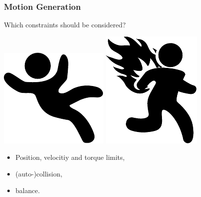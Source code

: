 \documentclass[14pt,utf8,hyperref={pdfpagelabels=false}]{beamer}
\begin{document}
\begin{slideDecision}
  \frametitle{Motion Generation}


  \begin{changeleftmargin}{1.1cm}
  \begin{center}
    Which constraints should be considered?\par
    \vspace{1cm}
    \includegraphics[width=.25\paperheight]{src/slides/falling.pdf}%
    \includegraphics[width=.25\paperheight]{src/slides/burning.pdf}\par
  \end{center}

  \begin{itemize}
  \item Position, velocitiy and torque limits,
  \item (auto-)collision,
  \item \alert{balance}.
  \end{itemize}
  \end{changeleftmargin}
\end{slideDecision}
\end{document}
